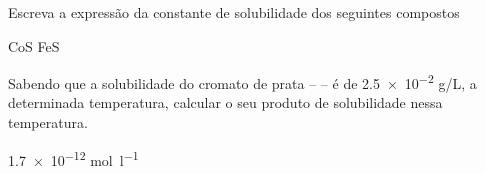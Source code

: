 \documentclass[11pt]{scrartcl}
\author{fabio}
\date{\today}
\title{}
\def\disciplina{Química}
\begin{document}
\twocolumn[

%
%
%



%

\smallbreak
\medbreak
\par\vspace{2ex}]%





\begin{exercise}
Escreva a expressão da constante de solubilidade dos seguintes compostos

\begin{choice}
\choice {} 
\choice {} 
\choice {} 
\choice {} 
\choice CoS 
\choice {} 
\choice {} 
\choice {} 
\choice {} 
\choice {} 
\choice {} 
\choice {} 
\choice {} 
\choice {} 
\choice FeS
\end{choice}
\end{exercise}

\begin{exercise}
Sabendo que a solubilidade do cromato de prata –  – é de \num{2.5e-2} g/L, a determinada temperatura, calcular o seu produto de solubilidade nessa temperatura.
\end{exercise}
\begin{solution}
\num{1.7e-12} \unit{\mol\per\litre}
\end{solution}
\end{document}
